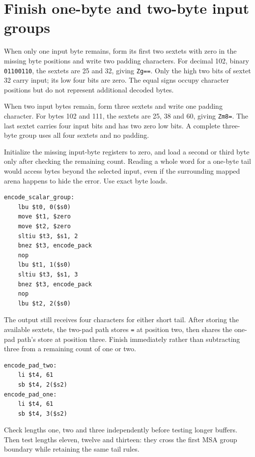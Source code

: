 \section{Finish one-byte and two-byte input groups}
When only one input byte remains, form its first two sextets with zero in the missing
byte positions and write two padding characters. For decimal 102, binary
\texttt{01100110}, the sextets are 25 and 32, giving \texttt{Zg==}. Only the high two
bits of sextet 32 carry input; its low four bits are zero. The equal signs occupy
character positions but do not represent additional decoded bytes.

When two input bytes remain, form three sextets and write one padding character.
For bytes 102 and 111, the sextets are 25, 38 and 60, giving \texttt{Zm8=}. The last
sextet carries four input bits and has two zero low bits. A complete three-byte group
uses all four sextets and no padding.

Initialize the missing input-byte registers to zero, and load a second or third byte
only after checking the remaining count. Reading a whole word for a one-byte tail would
access bytes beyond the selected input, even if the surrounding mapped arena happens
to hide the error. Use exact byte loads.

\begin{verbatim}
encode_scalar_group:
    lbu $t0, 0($s0)
    move $t1, $zero
    move $t2, $zero
    sltiu $t3, $s1, 2
    bnez $t3, encode_pack
    nop
    lbu $t1, 1($s0)
    sltiu $t3, $s1, 3
    bnez $t3, encode_pack
    nop
    lbu $t2, 2($s0)
\end{verbatim}

The output still receives four characters for either short tail. After storing the
available sextets, the two-pad path stores \texttt{=} at position two, then shares the
one-pad path's store at position three. Finish immediately rather than subtracting
three from a remaining count of one or two.

\begin{verbatim}
encode_pad_two:
    li $t4, 61
    sb $t4, 2($s2)
encode_pad_one:
    li $t4, 61
    sb $t4, 3($s2)
\end{verbatim}

Check lengths one, two and three independently before testing longer buffers. Then test
lengths eleven, twelve and thirteen: they cross the first MSA group boundary while
retaining the same tail rules.
